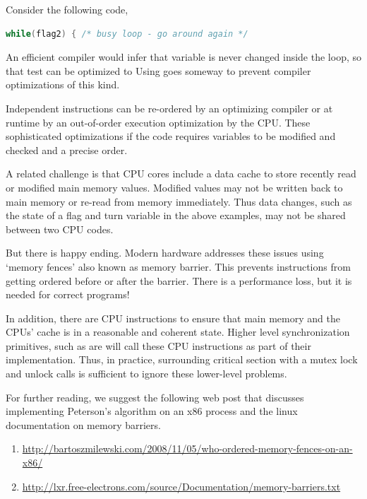Consider the following code,

\begin{lstlisting}[language=C]
while(flag2) { /* busy loop - go around again */
\end{lstlisting}

An efficient compiler would infer that  variable is never changed inside the loop, so that test can be optimized to  Using  goes someway to prevent compiler optimizations of this kind.

Independent instructions can be re-ordered by an optimizing compiler or at runtime by an out-of-order execution optimization by the CPU.
These sophisticated optimizations if the code requires variables to be modified and checked and a precise order.

A related challenge is that CPU cores include a data cache to store recently read or modified main memory values.
Modified values may not be written back to main memory or re-read from memory immediately.
Thus data changes, such as the state of a flag and turn variable in the above examples, may not be shared between two CPU codes.

But there is happy ending.
Modern hardware addresses these issues using `memory fences' also known as memory barrier.
This prevents instructions from getting ordered before or after the barrier.
There is a performance loss, but it is needed for correct programs!

In addition, there are CPU instructions to ensure that main memory and the CPUs' cache is in a reasonable and coherent state.
Higher level synchronization primitives, such as  are will call these CPU instructions as part of their implementation.
Thus, in practice, surrounding critical section with a mutex lock and unlock calls is sufficient to ignore these lower-level problems.

For further reading, we suggest the following web post that discusses implementing Peterson's algorithm on an x86 process and the linux documentation on memory barriers.
\begin{enumerate}
\item \href{Memory Fences}{http://bartoszmilewski.com/2008/11/05/who-ordered-memory-fences-on-an-x86/}
\item \href{Memory Barriers}{http://lxr.free-electrons.com/source/Documentation/memory-barriers.txt}
\end{enumerate}


